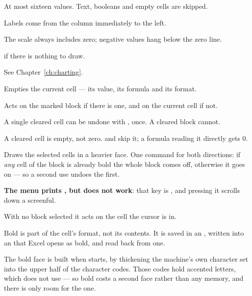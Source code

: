 \begin{ccsteps}
\item At most sixteen values. Text, booleans and empty cells are skipped.
\item Labels come from the column immediately to the left.
\item The scale always includes zero; negative values hang below the zero line.
\item {} if there is nothing to draw.
\item See Chapter~\ref{ch:charting}.
\end{ccsteps}


Empties the current cell --- its value, its formula and its format.

\begin{ccsteps}
\item Acts on the marked block if there is one, and on the current cell if not.
\item A single cleared cell can be undone with , once. A cleared block
cannot.
\item A cleared cell is empty, not zero.  and  skip it; a
formula reading it directly gets 0.
\end{ccsteps}


Draws the selected cells in a heavier face. One command for both directions:
if \emph{any} cell of the block is already bold the whole block comes off,
otherwise it goes on --- so a second use undoes the first.

\textbf{The menu prints , but  does not work}: that
key is , and pressing it scrolls down a screenful.

With no block selected it acts on the cell the cursor is in.

Bold is part of the cell's format, not its contents. It is saved in an
, written into an  that Excel opens as bold, and
read back from one.

\begin{ccnote}
The bold face is built when \ccprod{} starts, by thickening the machine's own
character set into the upper half of the character codes. Those codes hold
accented letters, which \ccprod{} does not use --- so bold costs a second
face rather than any memory, and there is only room for the one.
\end{ccnote}

